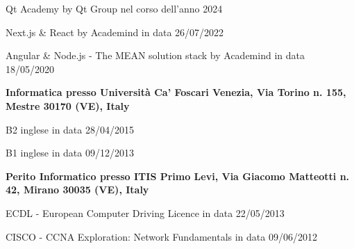 
\begin{scholarship}
    {Qt Academy by Qt Group nel corso dell'anno 2024}

    {Next.js \& React by Academind in data 26/07/2022}

    {Angular \& Node.js - The MEAN solution stack by Academind in data 18/05/2020}

    {\textbf{Informatica presso Università Ca' Foscari Venezia, Via Torino n. 155, Mestre 30170 (VE), Italy}}

    {B2 inglese in data 28/04/2015}

    {B1 inglese in data 09/12/2013}

    {\textbf{Perito Informatico presso ITIS Primo Levi, Via Giacomo Matteotti n. 42, Mirano 30035 (VE), Italy}}

    {ECDL - European Computer Driving Licence in data 22/05/2013}

    {CISCO - CCNA Exploration: Network Fundamentals in data 09/06/2012}
\end{scholarship}
